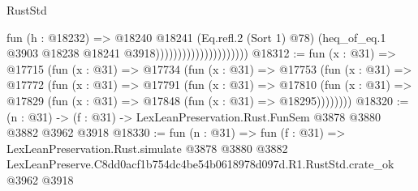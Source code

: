 \begin{lexlean}{RustStd}
\begin{coremodule}
                                          fun (h : @18232) =>
                                          @18240
                                            @18241
                                            (Eq.refl.{2} (Sort 1) @78)
                                            (heq_of_eq.{1}
                                              @3903
                                              @18238
                                              @18241
                                              @3918)))))))))))))))))))))
@18312 := fun (x : @31) =>
  @17715
    (fun (x : @31) =>
    @17734
      (fun (x : @31) =>
      @17753
        (fun (x : @31) =>
        @17772
          (fun (x : @31) =>
          @17791
            (fun (x : @31) =>
            @17810
              (fun (x : @31) => @17829 (fun (x : @31) => @17848 (fun (x : @31) => @18295))))))))
@18320 := (n : @31) -> (f : @31) -> LexLeanPreservation.Rust.FunSem @3878 @3880 @3882 @3962 @3918
@18330 := fun (n : @31) =>
  fun (f : @31) =>
  LexLeanPreservation.Rust.simulate
    @3878
    @3880
    @3882
    LexLeanPreserve.C8dd0acf1b754dc4be54b0618978d097d.R1.RustStd.crate_ok
    @3962
    @3918
\end{coremodule}
\end{lexlean}
